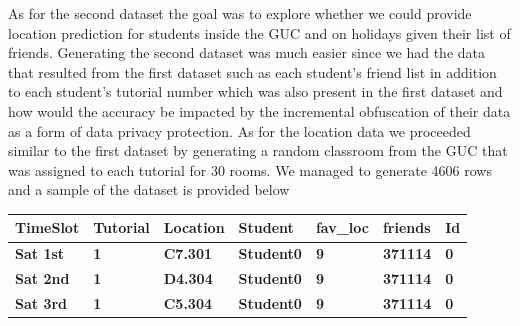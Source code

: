 As for the second dataset the goal was to explore whether we could provide location prediction for students inside the GUC and on holidays given their list of friends. Generating the second dataset was much easier since we had the data that resulted from the first dataset such as each student's friend list  in addition to each student's tutorial number
which was also present in the first dataset and how would the accuracy be impacted by the incremental obfuscation of their data as a form of data privacy protection. As for the location data we proceeded similar to the first dataset by generating a random classroom from the GUC that was assigned to each tutorial for 30 rooms. We managed to generate \num{4606} rows and a sample of the dataset is provided below
\newline
\begin{table}[!h]
  \begin{tabular}{|l|l|l|l|l|l|l|}
  \hline
  \multicolumn{1}{|c|}{\textbf{TimeSlot}}                    & \textbf{Tutorial}                                      & \multicolumn{1}{r|}{\textbf{Location}}                     & \textbf{Student}                                       & \textbf{fav\_loc}                                      & \textbf{friends}                                       & \textbf{Id}                                            \\ \hline
  \textbf{Sat 1st}                                       & \textbf{1}                                             & \textbf{C7.301}                                        & \textbf{Student0}                                      & \textbf{9}                                             & \textbf{371114}                                        & \textbf{0}                                             \\ \hline
  \textbf{Sat 2nd}                                       & \textbf{1}                                             & \textbf{D4.304}                                        & \textbf{Student0}                                      & \textbf{9}                                             & \textbf{371114}                                        & \textbf{0}                                             \\ \hline
  \textbf{Sat 3rd}                                       & \textbf{1}                                             & \textbf{C5.304}                                        & \textbf{Student0}                                      & \textbf{9}                                             & \textbf{371114}                                        & \textbf{0}                                             \\ \hline

\end{tabular}
\end{table}
